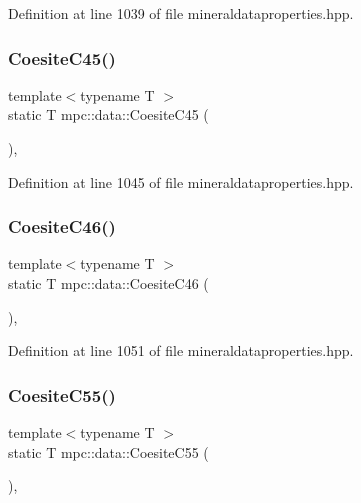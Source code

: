 Definition at line 1039 of file mineraldataproperties.\+hpp.

\mbox{\label{namespacempc_1_1data_a70ba9ab1b49082b5a4ff6dfc9a2a76c3}} 
\subsubsection{\texorpdfstring{Coesite\+C45()}{CoesiteC45()}}
{\footnotesize\ttfamily template$<$typename T $>$ \\
static T mpc\+::data\+::\+Coesite\+C45 (\begin{DoxyParamCaption}{ }\end{DoxyParamCaption})\hspace{0.3cm}{\ttfamily [inline]}, {\ttfamily [static]}}



Definition at line 1045 of file mineraldataproperties.\+hpp.

\mbox{\label{namespacempc_1_1data_a857ff4cf76dd69f8ba29aaad6c60006d}} 
\subsubsection{\texorpdfstring{Coesite\+C46()}{CoesiteC46()}}
{\footnotesize\ttfamily template$<$typename T $>$ \\
static T mpc\+::data\+::\+Coesite\+C46 (\begin{DoxyParamCaption}{ }\end{DoxyParamCaption})\hspace{0.3cm}{\ttfamily [inline]}, {\ttfamily [static]}}



Definition at line 1051 of file mineraldataproperties.\+hpp.

\mbox{\label{namespacempc_1_1data_ae80a3d2d484654a4cfcf4ca457db13cd}} 
\subsubsection{\texorpdfstring{Coesite\+C55()}{CoesiteC55()}}
{\footnotesize\ttfamily template$<$typename T $>$ \\
static T mpc\+::data\+::\+Coesite\+C55 (\begin{DoxyParamCaption}{ }\end{DoxyParamCaption})\hspace{0.3cm}{\ttfamily [inline]}, {\ttfamily [static]}}




